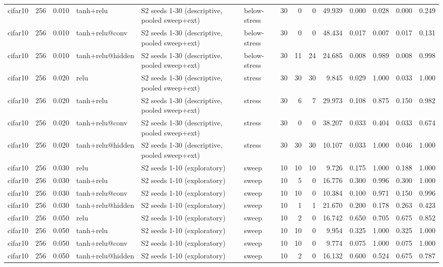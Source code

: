 \begin{table}[htbp]
{\begin{tabular}{@{}lrrlllrrrrrrrr@{}}
cifar10 & 256 & 0.010 & tanh+relu & S2 seeds 1-30 (descriptive, pooled sweep+ext) & below-stress & 30 & 0 & 0 & 49.939 & 0.000 & 0.028 & 0.000 & 0.249 \\
cifar10 & 256 & 0.010 & tanh+relu@conv & S2 seeds 1-30 (descriptive, pooled sweep+ext) & below-stress & 30 & 0 & 0 & 48.434 & 0.017 & 0.007 & 0.017 & 0.131 \\
cifar10 & 256 & 0.010 & tanh+relu@hidden & S2 seeds 1-30 (descriptive, pooled sweep+ext) & below-stress & 30 & 11 & 24 & 24.685 & 0.008 & 0.989 & 0.008 & 0.998 \\
cifar10 & 256 & 0.020 & relu & S2 seeds 1-30 (descriptive, pooled sweep+ext) & stress & 30 & 30 & 30 & 9.845 & 0.029 & 1.000 & 0.033 & 1.000 \\
cifar10 & 256 & 0.020 & tanh+relu & S2 seeds 1-30 (descriptive, pooled sweep+ext) & stress & 30 & 6 & 7 & 29.973 & 0.108 & 0.875 & 0.150 & 0.982 \\
cifar10 & 256 & 0.020 & tanh+relu@conv & S2 seeds 1-30 (descriptive, pooled sweep+ext) & stress & 30 & 0 & 0 & 38.207 & 0.033 & 0.404 & 0.033 & 0.674 \\
cifar10 & 256 & 0.020 & tanh+relu@hidden & S2 seeds 1-30 (descriptive, pooled sweep+ext) & stress & 30 & 30 & 30 & 10.107 & 0.033 & 1.000 & 0.046 & 1.000 \\
cifar10 & 256 & 0.030 & relu & S2 seeds 1-10 (exploratory) & sweep & 10 & 10 & 10 & 9.726 & 0.175 & 1.000 & 0.188 & 1.000 \\
cifar10 & 256 & 0.030 & tanh+relu & S2 seeds 1-10 (exploratory) & sweep & 10 & 5 & 0 & 16.776 & 0.300 & 0.996 & 0.300 & 1.000 \\
cifar10 & 256 & 0.030 & tanh+relu@conv & S2 seeds 1-10 (exploratory) & sweep & 10 & 10 & 0 & 10.384 & 0.100 & 0.971 & 0.150 & 0.996 \\
cifar10 & 256 & 0.030 & tanh+relu@hidden & S2 seeds 1-10 (exploratory) & sweep & 10 & 1 & 1 & 21.670 & 0.200 & 0.178 & 0.263 & 0.423 \\
cifar10 & 256 & 0.050 & relu & S2 seeds 1-10 (exploratory) & sweep & 10 & 2 & 0 & 16.742 & 0.650 & 0.705 & 0.675 & 0.852 \\
cifar10 & 256 & 0.050 & tanh+relu & S2 seeds 1-10 (exploratory) & sweep & 10 & 10 & 0 & 9.954 & 0.325 & 1.000 & 0.325 & 1.000 \\
cifar10 & 256 & 0.050 & tanh+relu@conv & S2 seeds 1-10 (exploratory) & sweep & 10 & 10 & 0 & 9.774 & 0.075 & 1.000 & 0.075 & 1.000 \\
cifar10 & 256 & 0.050 & tanh+relu@hidden & S2 seeds 1-10 (exploratory) & sweep & 10 & 2 & 0 & 16.132 & 0.600 & 0.524 & 0.675 & 0.787 \\

\end{tabular}}
\end{table}
